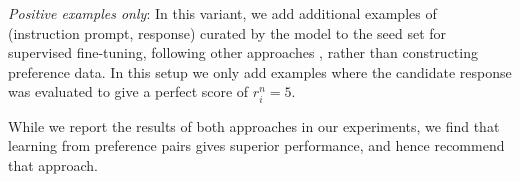 \documentclass{article}
\begin{document}
{\em Positive examples only}: In this variant, we add additional examples of (instruction prompt, response) curated by the model to the seed set for supervised fine-tuning, following other approaches \citep{li2023self,adolphs2022cringe,gulcehre2023reinforced}, rather than constructing preference data. In this setup we only add examples where the candidate response was evaluated to give a perfect score of $r_i^n=5$. 


While we report the results of both approaches in our experiments, we find that learning from  preference pairs gives superior performance, and hence recommend that approach.
\fi 

\end{document}

